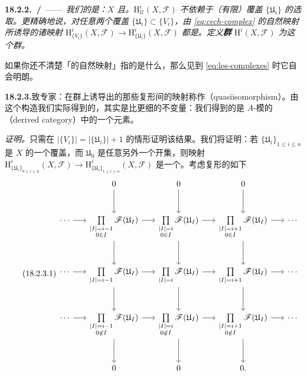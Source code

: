 \textbf{18.2.2.\ \trhTheorem{}/}\ ——\ \emph{我们的\trStandingHypothesis{}是：$X$ \trQuasicompact{}且\trSeparated。$\mathrm{H}^i_{\mathscr{U}}(X,\mathscr{F})$ 不依赖于（有限）覆盖 $\{\mathfrak{U}_i\}$ 的选取。更精确地说，对任意两个覆盖 $\{\mathfrak{U}_i\}\subset\{V_i\}$，由\trCech\trComplexN{} \eqref{eq:cech-complex} 的自然映射所诱导的诸映射 $\mathrm{H}^i_{\{V_i\}}(X,\mathscr{F})\to\mathrm{H}^i_{\{\mathfrak{U}_i\}}(X,\mathscr{F})$ 都是\trIsomorphism。定义\textbf{\trCechCohomology{}群} $\mathrm{H}^i(X,\mathscr{F})$ 为这个群。}

如果你还不清楚「\trCech\trComplexN{}的自然映射」指的是什么，那么见到 \eqref{eq:les-complexes} 时它自会明朗。

\textbf{18.2.3.}\quad 致专家：在\trCohomology{}群上诱导出\trIsomorphism{}的那些复形间的映射称作\textbf{\trQuasiisomorphism}（quasiisomorphism）。由这个构造我们实际得到的，其实是比\trCohomology{}更细的不变量：我们得到的是 $A$-模的\emph{\trDerivedCategory}（derived category）中的一个元素。

\emph{证明。}\quad 只需在 $|\{V_i\}|=|\{\mathfrak{U}_i\}|+1$ 的情形证明该结果。我们将证明：若 $\{\mathfrak{U}_i\}_{1\le i\le n}$ 是 $X$ 的一个覆盖，而 $\mathfrak{U}_0$ 是任意另外一个\trAffine{}开集，则映射 $\mathrm{H}^i_{\{\mathfrak{U}_i\}_{0\le i\le n}}(X,\mathscr{F})\to\mathrm{H}^i_{\{\mathfrak{U}_i\}_{1\le i\le n}}(X,\mathscr{F})$ 是一个\trIsomorphism。考虑复形的如下\trExactSequence
\begin{equation*}\tag{18.2.3.1}\label{eq:les-complexes}
\begin{tikzcd}[row sep=2.9em, column sep=1.6em]
& 0 \ar[d] & 0 \ar[d] & 0 \ar[d] & \\
\cdots \ar[r] & \prod\limits_{\substack{|I|=i-1\\ 0\in I}}\mathscr{F}(\mathfrak{U}_I) \ar[r] \ar[d] & \prod\limits_{\substack{|I|=i\\ 0\in I}}\mathscr{F}(\mathfrak{U}_I) \ar[r] \ar[d] & \prod\limits_{\substack{|I|=i+1\\ 0\in I}}\mathscr{F}(\mathfrak{U}_I) \ar[r] \ar[d] & \cdots \\
\cdots \ar[r] & \prod\limits_{|I|=i-1}\mathscr{F}(\mathfrak{U}_I) \ar[r] \ar[d] & \prod\limits_{|I|=i}\mathscr{F}(\mathfrak{U}_I) \ar[r] \ar[d] & \prod\limits_{|I|=i+1}\mathscr{F}(\mathfrak{U}_I) \ar[r] \ar[d] & \cdots \\
\cdots \ar[r] & \prod\limits_{\substack{|I|=i-1\\ 0\notin I}}\mathscr{F}(\mathfrak{U}_I) \ar[r] \ar[d] & \prod\limits_{\substack{|I|=i\\ 0\notin I}}\mathscr{F}(\mathfrak{U}_I) \ar[r] \ar[d] & \prod\limits_{\substack{|I|=i+1\\ 0\notin I}}\mathscr{F}(\mathfrak{U}_I) \ar[r] \ar[d] & \cdots \\
& 0 & 0 & 0. &
\end{tikzcd}
\end{equation*}

